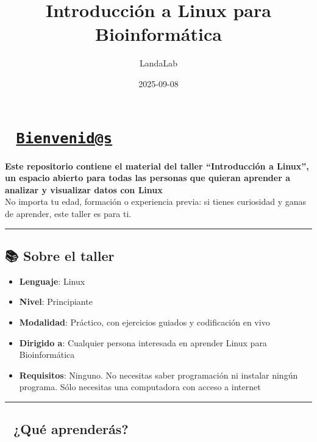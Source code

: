\documentclass[
]{book}
\title{Introducción a Linux para Bioinformática}
\author{LandaLab}
\date{2025-09-08}
\providecommand{\tightlist}{%
  \setlength{\itemsep}{0pt}\setlength{\parskip}{0pt}}
\begin{document}
\maketitle

{
\setcounter{tocdepth}{1}
\tableofcontents
}
\chapter{\texorpdfstring{🧪 \href{mailto:Bienvenid@s}{\nolinkurl{Bienvenid@s}}}{🧪 Bienvenid@s}}\label{bienvenids}

\textbf{Este repositorio contiene el material del taller ``Introducción a Linux'', un espacio abierto para todas las personas que quieran aprender a analizar y visualizar datos con Linux}\\
No importa tu edad, formación o experiencia previa: si tienes curiosidad y ganas de aprender, este taller es para ti.

\begin{center}\rule{0.5\linewidth}{0.5pt}\end{center}

\section{📚 Sobre el taller}\label{sobre-el-taller}

\begin{itemize}
\tightlist
\item
  \textbf{Lenguaje}: Linux
\item
  \textbf{Nivel}: Principiante\\
\item
  \textbf{Modalidad}: Práctico, con ejercicios guiados y codificación en vivo\\
\item
  \textbf{Dirigido a}: Cualquier persona interesada en aprender Linux para Bioinformática\\
\item
  \textbf{Requisitos}: Ninguno. No necesitas saber programación ni instalar ningún programa. Sólo necesitas una computadora con acceso a internet
\end{itemize}

\begin{center}\rule{0.5\linewidth}{0.5pt}\end{center}

\section{🧰 ¿Qué aprenderás?}\label{quuxe9-aprenderuxe1s}
\end{document}
